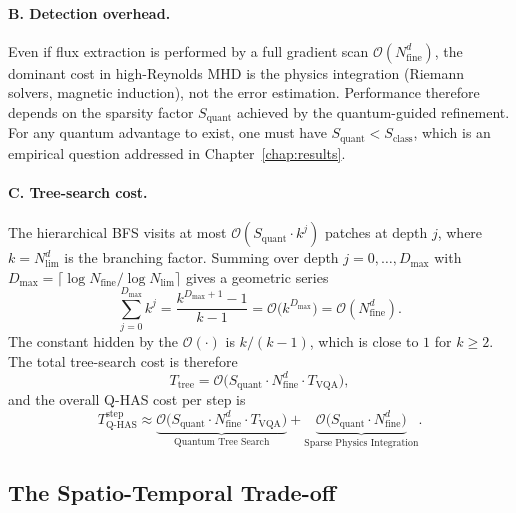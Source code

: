 \documentclass[12pt, a4paper, oneside]{report}
\begin{document}
\paragraph{B. Detection overhead.}
Even if flux extraction is performed by a full gradient scan $\mathcal{O}(N_{\text{fine}}^d)$, the dominant cost in high-Reynolds MHD is the physics integration (Riemann solvers, magnetic induction), not the error estimation. Performance therefore depends on the sparsity factor $S_{\text{quant}}$ achieved by the quantum-guided refinement. For any quantum advantage to exist, one must have $S_{\text{quant}} < S_{\text{class}}$, which is an empirical question addressed in Chapter~\ref{chap:results}.

\paragraph{C. Tree-search cost.}
The hierarchical BFS visits at most $\mathcal{O}(S_{\text{quant}} \cdot k^j)$ patches at depth $j$, where $k = N_{\text{lim}}^d$ is the branching factor. Summing over depth $j = 0, \dots, D_{\max}$ with $D_{\max} = \lceil \log N_{\text{fine}} / \log N_{\text{lim}} \rceil$ gives a geometric series
\begin{equation}
    \sum_{j=0}^{D_{\max}} k^{j} = \frac{k^{D_{\max}+1} - 1}{k-1} = \mathcal{O}\bigl(k^{D_{\max}}\bigr) = \mathcal{O}(N_{\text{fine}}^d).
\end{equation}
The constant hidden by the $\mathcal{O}(\cdot)$ is $k/(k-1)$, which is close to $1$ for $k \ge 2$. The total tree-search cost is therefore
\begin{equation}
    T_{\text{tree}} = \mathcal{O}\bigl(S_{\text{quant}} \cdot N_{\text{fine}}^d \cdot T_{\text{VQA}}\bigr),
\end{equation}
and the overall Q-HAS cost per step is
\begin{equation}
    T_{\text{Q-HAS}}^{\text{step}} \approx \underbrace{\mathcal{O}\bigl( S_{\text{quant}} \cdot N_{\text{fine}}^d \cdot T_{\text{VQA}} \bigr)}_{\text{Quantum Tree Search}} + \underbrace{\mathcal{O}\bigl( S_{\text{quant}} \cdot N_{\text{fine}}^d \bigr)}_{\text{Sparse Physics Integration}}.
\end{equation}

\subsection*{The Spatio-Temporal Trade-off}
\end{document}

